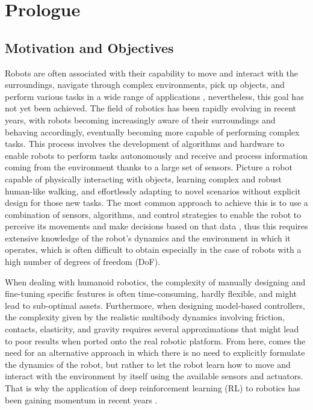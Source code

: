 \chapter*{Prologue}
\label{chp:00-Prologue}

\section*{Motivation and Objectives}

Robots are often associated with their capability to move and interact with the surroundings, navigate through complex environments, pick up objects, and perform various tasks in a wide range of applications \citep{article,zeng_robotic_2022}, nevertheless, this goal has not yet been achieved. The field of robotics has been rapidly evolving in recent years, with robots becoming increasingly aware of their surroundings and behaving accordingly, eventually becoming more capable of performing complex tasks. This process involves the development of algorithms and hardware to enable robots to perform tasks autonomously and receive and process information coming from the environment thanks to a large set of sensors. Picture a robot capable of physically interacting with objects, learning complex and robust human-like walking, and effortlessly adapting to novel scenarios without explicit design for those new tasks.
The most common approach to achieve this is to use a combination of sensors, algorithms, and control strategies to enable the robot to perceive its movements and make decisions based on that data \citep{lara_embodied_2018, vaisi_review_2022}, thus this requires extensive knowledge of the robot's dynamics and the environment in which it operates, which is often difficult to obtain especially in the case of robots with a high number of degrees of freedom (\ac{DoF}).

When dealing with humanoid robotics, the complexity of manually designing and fine-tuning specific features is often time-consuming, hardly flexible, and might lead to sub-optimal assets. Furthermore, when designing model-based controllers, the complexity given by the realistic multibody dynamics involving friction, contacts, elasticity, and gravity requires several approximations that might lead to poor results when ported onto the real robotic platform. From here, comes the need for an alternative approach in which there is no need to explicitly formulate the dynamics of the robot, but rather to let the robot learn how to move and interact with the environment by itself using the available sensors and actuators. That is why the application of deep reinforcement learning (\ac{RL}) to robotics has been gaining momentum in recent years \citep{golroudbari_recent_2023,li_reinforcement_2021}.

